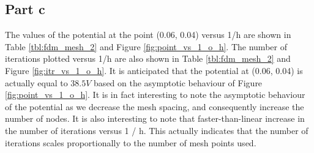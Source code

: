 \documentclass[11pt]{amsart}
\begin{document}
\subsection*{Part c}
The values of the potential at the point (0.06, 0.04) versus 1/h are shown in Table \ref{tbl:fdm_mesh_2} and Figure \ref{fig:point_vs_1_o_h}. The number of iterations plotted versus 1/h are also shown in Table \ref{tbl:fdm_mesh_2} and Figure \ref{fig:itr_vs_1_o_h}. It is anticipated that the potential at (0.06, 0.04) is actually equal to $38.5 V$ based on the asymptotic behaviour of Figure \ref{fig:point_vs_1_o_h}. It is in fact interesting to note the asymptotic behaviour of the potential as we decrease the mesh spacing, and consequently increase the number of nodes. It is also interesting to note that faster-than-linear increase in the number of iterations versus 1 / h. This actually indicates that the number of iterations scales proportionally to the number of mesh points used.
\end{document}
